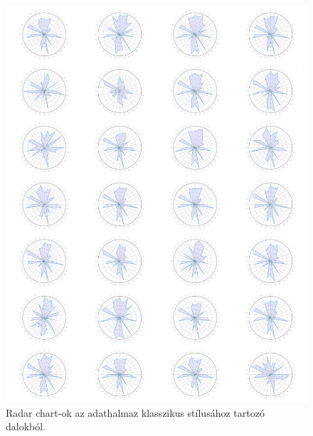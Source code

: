 \begin{figure}[p]
    \includegraphics{src/images/radar_classical.png}
    \caption{Radar chart-ok az adathalmaz klasszikus stílusához tartozó dalokból.}
\end{figure}

